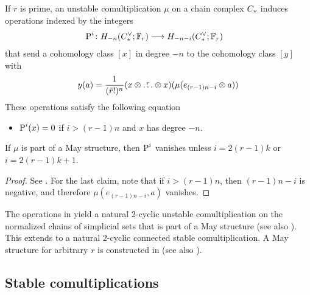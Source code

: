 \begin{proposition}\label{prop:unstable}
	If $r$ is prime, an unstable comultiplication $\mu$ on a chain complex $C_{*}$ induces operations indexed by the integers
	\begin{align*}
		\operatorname{P}^{i} \colon  H_{-n}(C^\vee_{*};\mathbb{F}_r)&\longrightarrow H_{-n-i}(C^\vee_{*};\mathbb{F}_r)
	\end{align*}
	that send a cohomology class $[x]$ in degree $-n$ to the cohomology class $[y]$ with
	\[
	y(a) = \frac{1}{(\tilde{r}!)^n}(x \otimes  \overset{r}{\ldots} \otimes  x)(\mu(e_{(r-1)n-i} \otimes  a))
	\]
	These operations satisfy the following equation
	\begin{itemize}
		\item $\operatorname{P}^i(x) = 0$ if $i>(r-1)n$ and $x$ has degree $-n$.
	\end{itemize}
\end{proposition}
\begin{remark} If $\mu$ is part of a May structure, then $\operatorname{P}^i$ vanishes unless $i = 2(r-1)k$ or $i = 2(r-1)k+1$.
\end{remark}

\begin{proof} See \cite{may1970general}.    %
	For the last claim, note that if $i>(r-1)n$, then $(r-1)n-i$ is negative, and therefore $\mu(e_{(r-1)n-i},a)$ vanishes.
\end{proof}
\begin{example}
		The operations in \cite{steenrod1947products} yield a natural $2$-cyclic unstable comultiplication on the normalized chains of simplicial sets that is part of a May structure \cite{medina2021may_st} (see also \cite{gonzalez-diaz1999steenrod, medina2021fast_sq}). This extends to a natural $2$-cyclic connected stable comultiplication. A May structure for arbitrary $r$ is constructed in \cite{medina2021may_st} (see also \cite{brumfiel2023explicit}).
\end{example}



\subsection{Stable comultiplications}\label{s:stable}

